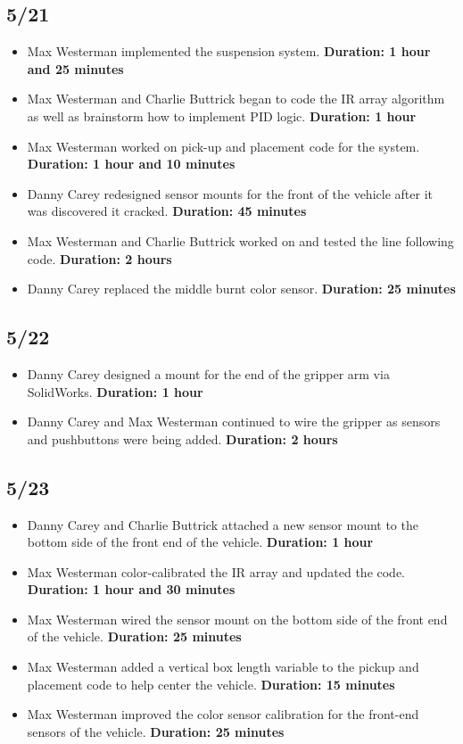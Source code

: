 \documentclass[11pt]{report}
\begin{document}
\subsection*{5/21}

\begin{itemize}
    \item Max Westerman implemented the suspension system. \textbf{Duration: 1 hour and 25 minutes}
    \item Max Westerman and Charlie Buttrick began to code the \gls{IR} array algorithm as well as brainstorm how to implement \gls{PID} logic. \textbf{Duration: 1 hour}
    \item Max Westerman worked on pick-up and placement code for the system. \textbf{Duration: 1 hour and 10 minutes}
    \item Danny Carey redesigned sensor mounts for the front of the vehicle after it was discovered it cracked. \textbf{Duration: 45 minutes}
    \item Max Westerman and Charlie Buttrick worked on and tested the line following code. \textbf{Duration: 2 hours}
    \item Danny Carey replaced the middle burnt color sensor. \textbf{Duration: 25 minutes}
\end{itemize}

\subsection*{5/22}

\begin{itemize}
    \item Danny Carey designed a mount for the end of the gripper arm via SolidWorks. \textbf{Duration: 1 hour}
    \item Danny Carey and Max Westerman continued to wire the gripper as sensors and pushbuttons were being added. \textbf{Duration: 2 hours}
\end{itemize}

\subsection*{5/23}

\begin{itemize}
    \item Danny Carey and Charlie Buttrick attached a new sensor mount to the bottom side of the front end of the vehicle. \textbf{Duration: 1 hour}
    \item Max Westerman color-calibrated the \gls{IR} array and updated the code. \textbf{Duration: 1 hour and 30 minutes}
    \item Max Westerman wired the sensor mount on the bottom side of the front end of the vehicle. \textbf{Duration: 25 minutes}
    \item Max Westerman added a vertical box length variable to the pickup and placement code to help center the vehicle. \textbf{Duration: 15 minutes}
    \item Max Westerman improved the color sensor calibration for the front-end sensors of the vehicle. \textbf{Duration: 25 minutes}
\end{itemize}
\end{document}
